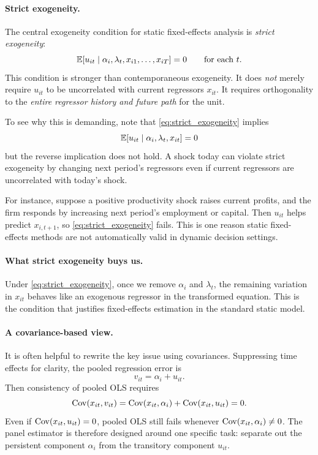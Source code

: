 \paragraph{Strict exogeneity.}
The central exogeneity condition for static fixed-effects analysis is \emph{strict exogeneity}:
\begin{equation}
\mathbb{E}[u_{it} \mid \alpha_i, \lambda_t, x_{i1},\dots,x_{iT}] = 0
\qquad \text{for each } t.
\label{eq:strict_exogeneity}
\end{equation}
This condition is stronger than contemporaneous exogeneity. It does \emph{not} merely require $u_{it}$ to be uncorrelated with current regressors $x_{it}$. It requires orthogonality to the \emph{entire regressor history and future path} for the unit.

To see why this is demanding, note that \eqref{eq:strict_exogeneity} implies
\[
\mathbb{E}[u_{it} \mid \alpha_i,\lambda_t,x_{it}] = 0
\]
but the reverse implication does not hold. A shock today can violate strict exogeneity by changing next period's regressors even if current regressors are uncorrelated with today's shock.

For instance, suppose a positive productivity shock raises current profits, and the firm responds by increasing next period's employment or capital. Then $u_{it}$ helps predict $x_{i,t+1}$, so \eqref{eq:strict_exogeneity} fails. This is one reason static fixed-effects methods are not automatically valid in dynamic decision settings.

\paragraph{What strict exogeneity buys us.}
Under \eqref{eq:strict_exogeneity}, once we remove $\alpha_i$ and $\lambda_t$, the remaining variation in $x_{it}$ behaves like an exogenous regressor in the transformed equation. This is the condition that justifies fixed-effects estimation in the standard static model.

\paragraph{A covariance-based view.}
It is often helpful to rewrite the key issue using covariances. Suppressing time effects for clarity, the pooled regression error is
\[
v_{it} = \alpha_i + u_{it}.
\]
Then consistency of pooled \ac{OLS} requires
\[
\operatorname{Cov}(x_{it},v_{it}) = \operatorname{Cov}(x_{it},\alpha_i) + \operatorname{Cov}(x_{it},u_{it}) = 0.
\]
Even if $\operatorname{Cov}(x_{it},u_{it})=0$, pooled \ac{OLS} still fails whenever $\operatorname{Cov}(x_{it},\alpha_i)\neq 0$. The panel estimator is therefore designed around one specific task: separate out the persistent component $\alpha_i$ from the transitory component $u_{it}$.

